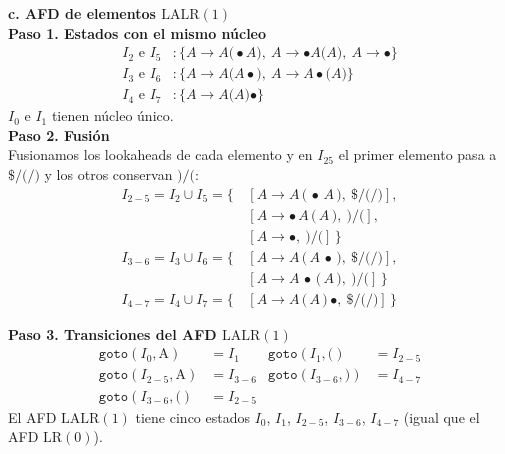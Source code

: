 \documentclass[12pt,letterpaper]{article}
\newcommand{\nt}[1]{\textit{#1}}
\newcommand{\tk}[1]{\texttt{#1}}
\newcommand{\tx}[1]{\text{#1}}
\newcommand{\lrc}{\mathrm{LR(0)}}
\newcommand{\lalr}{\mathrm{LALR(1)}}
\begin{document}
\begin{enumerate}[label=\arabic*.]
  \bigskip
  \bigskip
  
  \textbf{\large c. AFD de elementos $\lalr$}\\

  \textbf{Paso 1. Estados con el mismo núcleo}
  \[
  \begin{aligned}
    I_2 \text{ e } I_5 &: \{\nt{A}\to\nt{A}\tk{(}\bullet\nt{A}\tk{)},\ \nt{A}\to\bullet\nt{A}\tk{(}\nt{A}\tk{)},\ \nt{A}\to\bullet\}\\
    I_3 \text{ e } I_6 &: \{\nt{A}\to\nt{A}\tk{(}\nt{A}\bullet\tk{)},\ \nt{A}\to\nt{A}\bullet\tk{(}\nt{A}\tk{)}\}\\
    I_4 \text{ e } I_7 &: \{\nt{A}\to\nt{A}\tk{(}\nt{A}\tk{)}\bullet\}
  \end{aligned}
  \]
  $I_0$ e $I_1$ tienen núcleo único.\\

  \textbf{Paso 2. Fusión}\\
  Fusionamos los lookaheads de cada elemento y en $I_{25}$ el primer elemento pasa a $\tk{\$}/\tk{(}/\tk{)}$
  y los otros conservan $\tk{)}/\tk{(}$:
  \[
  \begin{aligned}
    I_{2-5} = I_2 \cup I_5 = \{\, & [\nt{A}\to\nt{A}\,\tk{(}\,\bullet\,\nt{A}\,\tk{)},\ \tk{\$}/\tk{(}/\tk{)}],\\
    & [\nt{A}\to\bullet\,\nt{A}\,\tk{(}\,\nt{A}\,\tk{)},\ \tk{)}/\tk{(}],\\
    & [\nt{A}\to\bullet,\ \tk{)}/\tk{(}]\,\}\\[6pt]
    I_{3-6} = I_3 \cup I_6 = \{\, & [\nt{A}\to\nt{A}\,\tk{(}\,\nt{A}\,\bullet\,\tk{)},\ \tk{\$}/\tk{(}/\tk{)}],\\
    & [\nt{A}\to\nt{A}\,\bullet\,\tk{(}\,\nt{A}\,\tk{)},\ \tk{)}/\tk{(}]\,\}\\[6pt]
    I_{4-7} = I_4 \cup I_7 = \{\, & [\nt{A}\to\nt{A}\,\tk{(}\,\nt{A}\,\tk{)}\,\bullet,\ \tk{\$}/\tk{(}/\tk{)}]\,\}
  \end{aligned}
  \]
  
  \bigskip
  
  \textbf{Paso 3. Transiciones del AFD $\lalr$}
  \[
  \begin{aligned}
    \texttt{goto}(I_0,\tx{A}) &= I_1 & \texttt{goto}(I_1,\tk{(}) &= \boxed{I_{2-5}}\\[3pt]
    \texttt{goto}(I_{2-5},\tx{A}) &= \boxed{I_{3-6}} & \texttt{goto}(I_{3-6},\tk{)}) &= \boxed{I_{4-7}}\\[3pt]
    \texttt{goto}(I_{3-6},\tk{(}) &= I_{2-5} &&
  \end{aligned}
  \]
  El AFD $\lalr$ tiene cinco estados $I_0$, $I_1$, $I_{2-5}$, $I_{3-6}$, $I_{4-7}$ (igual que el AFD $\lrc$).


\end{enumerate}
\end{document}
